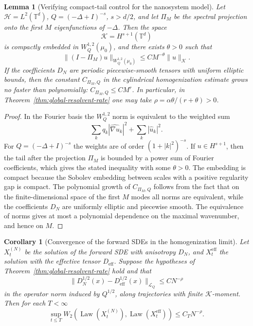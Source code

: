 \documentclass{article}
\newtheorem{lemma}[theorem]{Lemma}
\newtheorem{corollary}[theorem]{Corollary}
\newcommand{\Hh}{\mathcal H}
\newcommand{\LL}{\mathcal L}
\newcommand{\Law}{\operatorname{Law}}
\begin{document}
\begin{lemma}[Verifying compact-tail control for the nanosystem model]
\label{lem:nano-compact-tail}
Let \(\Hh=L^2(\mathbb T^d)\), \(Q=(-\Delta+I)^{-s}\), \(s>d/2\), and let
\(\Pi_M\) be the spectral projection onto the first \(M\) eigenfunctions of
\(-\Delta\). Then the space
\[
        \mathcal K=H^{s+1}(\mathbb T^d)
\]
is compactly embedded in \(W_Q^{1,2}(\mu_0)\), and there exists \(\theta>0\)
such that
\[
        \|(I-\Pi_M)u\|_{W_Q^{1,2}(\mu_0)}
        \le C M^{-\theta}\|u\|_{\mathcal K}.
\]
If the coefficients \(D_N\) are periodic piecewise-smooth tensors with uniform
elliptic bounds, then the constant \(C_{\Pi_M,Q}\) in the cylindrical
homogenization estimate grows no faster than polynomially:
\(C_{\Pi_M,Q}\le C M^r\). In particular, in
Theorem~\ref{thm:global-resolvent-rate} one may take
\(\rho=\alpha\theta/(r+\theta)>0\).
\end{lemma}

\begin{proof}
In the Fourier basis the \(W_Q^{1,2}\) norm is equivalent to the weighted sum
\[
        \sum_k q_k |\widehat{\nabla u}_k|^2 +\sum_k |\hat u_k|^2 .
\]
For \(Q=(-\Delta+I)^{-s}\) the weights are of order \((1+|k|^2)^{-s}\). If
\(u\in H^{s+1}\), then the tail after the projection \(\Pi_M\) is bounded by
a power sum of Fourier coefficients, which gives the stated inequality with
some \(\theta>0\). The embedding is compact because the Sobolev embedding between scales with a positive regularity gap is compact. The polynomial growth of \(C_{\Pi_M,Q}\) follows from the fact that on
the finite-dimensional space of the first \(M\) modes all norms are
equivalent, while the coefficients \(D_N\) are uniformly elliptic and
piecewise smooth. The equivalence of norms gives at most a polynomial
dependence on the maximal wavenumber, and hence on \(M\).
\end{proof}

\begin{corollary}[Convergence of the forward SDEs in the homogenization limit]
\label{cor:sde-homogenization-w2}
Let \(X_t^{(N)}\) be the solution of the forward SDE with anisotropy \(D_N\),
and \(X_t^{\mathrm{eff}}\) the solution with the effective tensor
\(D_{\mathrm{eff}}\). Suppose the hypotheses of
Theorem~\ref{thm:global-resolvent-rate} hold and that
\[
        \|D_N^{1/2}(x)-D_{\mathrm{eff}}^{1/2}(x)\|_{\LL_Q}
        \le C N^{-\rho}
\]
in the operator norm induced by \(Q^{1/2}\), along trajectories with finite
\(\mathcal K\)-moment. Then for each \(T<\infty\)
\[
        \sup_{t\le T}W_2(\Law(X_t^{(N)}),\Law(X_t^{\mathrm{eff}}))
        \le C_T N^{-\rho}.
\]
\end{corollary}
\end{document}
